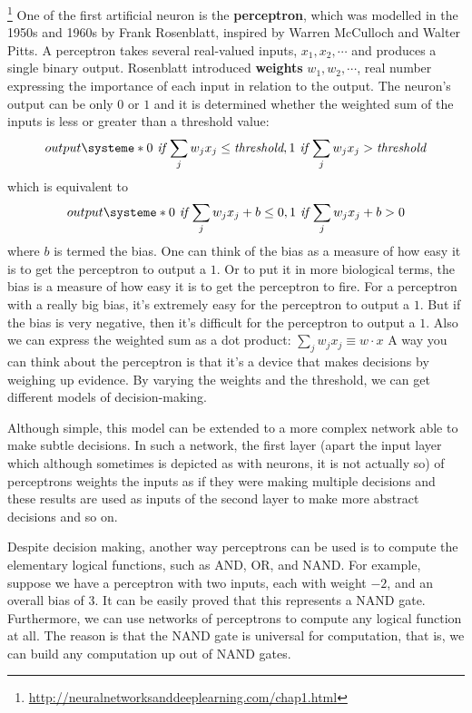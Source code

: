 \documentclass[12pt, letterpaper]{article}
\theoremstyle{definition}
\let\ti\textit
\let\tb\textbf
\begin{document}
\footnote{\url{http://neuralnetworksanddeeplearning.com/chap1.html}} One of the first artificial neuron is the \tb{perceptron}, which was modelled in the 1950s and 1960s by Frank Rosenblatt, inspired by Warren McCulloch and Walter Pitts. A perceptron takes several real-valued inputs, $x_1, x_2,\cdots$ and produces a single binary output. Rosenblatt introduced \tb{weights} $w_1, w_2, \cdots$, real number expressing the importance of each input in relation to the output. The neuron's output can be only $0$ or $1$ and it is determined whether the weighted sum of the inputs is less or greater than a threshold value:
\begin{equation}
output \systeme*{0 \textit{ if } {\sum_j w_j x_j \le \ti{threshold}} ,1 \textit{ if } {\sum_j w_j x_j> \ti{threshold}}}
\end{equation}
which is equivalent to 
\begin{equation}
output \systeme*{0 \textit{ if } {\sum_j w_j x_j+b \le 0} ,1 \ti{ if } {\sum_j w_j x_j +b> 0}}
\label{eq:PerceptronInequalities}
\end{equation}
where $b$ is termed the bias. One can think of the bias as a measure of how easy it is to get the perceptron to output a $1$. Or to put it in more biological terms, the bias is a measure of how easy it is to get the perceptron to fire. For a perceptron with a really big bias, it's extremely easy for the perceptron to output a $1$. But if the bias is very negative, then it's difficult for the perceptron to output a $1$.
Also we can express the weighted sum as a dot product: $\sum_j w_j x_j \equiv w \cdot x$
A way you can think about the perceptron is that it's a device that makes decisions by weighing up evidence. By varying the weights and the threshold, we can get different models of decision-making. 

Although simple, this model can be extended to a more complex network able to make subtle decisions. In such a network, the first layer (apart the input layer which although sometimes is depicted as with neurons, it is not actually so) of perceptrons weights the inputs as if they were making multiple decisions and these results are used as inputs of the second layer to make more abstract decisions and so on.

Despite decision making, another way perceptrons can be used is to compute the elementary logical functions, such as AND, OR, and NAND. For example, suppose we have a perceptron with two inputs, each with weight $-2$, and an overall bias of $3$. It can be easily proved that this represents a NAND gate. Furthermore, we can use networks of perceptrons to compute any logical function at all. The reason is that the NAND gate is universal for computation, that is, we can build any computation up out of NAND gates.
\end{document}
